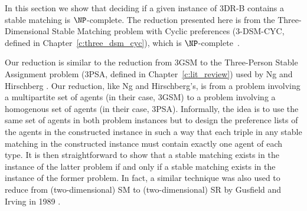 In this section we show that deciding if a given instance of 3DR-B contains a stable matching is $\NP$-complete. The reduction presented here is from the Three-Dimensional Stable Matching problem with Cyclic preferences (3-DSM-CYC, defined in Chapter~\ref{c:three_dsm_cyc}), which is $\NP$-complete~\cite{Plaxton3DSMCYCJournal}. 

Our reduction is similar to the reduction from 3GSM to the Three-Person Stable Assignment problem (3PSA, defined in Chapter~\ref{c:lit_review}) used by Ng and Hirschberg \cite{NH91}. Our reduction, like Ng and Hirschberg's, is from a problem involving a multipartite set of agents (in their case, 3GSM) to a problem involving a homogenous set of agents (in their case, 3PSA). Informally, the idea is to use the same set of agents in both problem instances but to design the preference lists of the agents in the constructed instance in such a way that each triple in any stable matching in the constructed instance must contain exactly one agent of each type. It is then straightforward to show that a stable matching exists in the instance of the latter problem if and only if a stable matching exists in the instance of the former problem. In fact, a similar technique was also used to reduce from (two-dimensional) SM to (two-dimensional) SR by Gusfield and Irving in 1989 \cite[Lemma~4.1.1]{GI89}.



